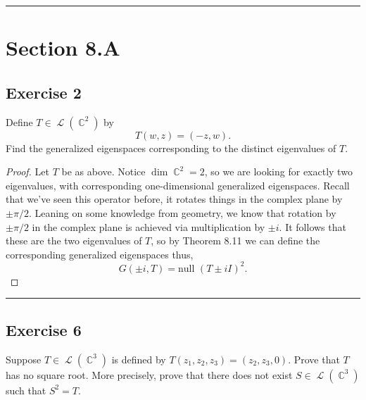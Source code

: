 \documentclass[letterpaper, 12pt]{amsart}
\DeclareMathOperator{\C}{\mathbb{C}}				%
\DeclareMathOperator{\Ell}{\mathscr{L}}				%
\renewcommand{\null}{\text{null }}					%
\theoremstyle{definition}  							%
\begin{document}
		\vspace*{2mm}
		\hrule
		\vspace*{2mm}

	\section*{Section 8.A}
		\subsection*{Exercise 2}
		Define $T \in \Ell(\C^2)$ by $$T(w,z) = (-z,w).$$
		Find the generalized eigenspaces corresponding to the distinct eigenvalues of $T$.

		\begin{proof}
		Let $T$ be as above.
		Notice $\dim \C^2 = 2$, so we are looking for exactly two eigenvalues, with corresponding one-dimensional generalized eigenspaces.
		Recall that we've seen this operator before, it rotates things in the complex plane by $\pm\pi/2$.
		Leaning on some knowledge from geometry, we know that rotation by $\pm\pi/2$ in the complex plane is achieved via multiplication by $\pm i$.
		It follows that these are the two eigenvalues of $T$, so by Theorem 8.11 we can define the corresponding generalized eigenspaces thus, $$G(\pm i,T) = \null(T \pm iI)^2.$$			
		\end{proof}
		\vspace*{2mm}
		\hrule
		\vspace*{2mm}

		\subsection*{Exercise 6}
		Suppose $T \in \Ell(\C^3)$ is defined by $T(z_{1}, z_{2}, z_{3}) = (z_{2},z_{3},0)$. 
		Prove that $T$ has no square root. 
		More precisely, prove that there does not exist $S \in \Ell(\C^3)$ such that $S^2=T$.
\end{document}
